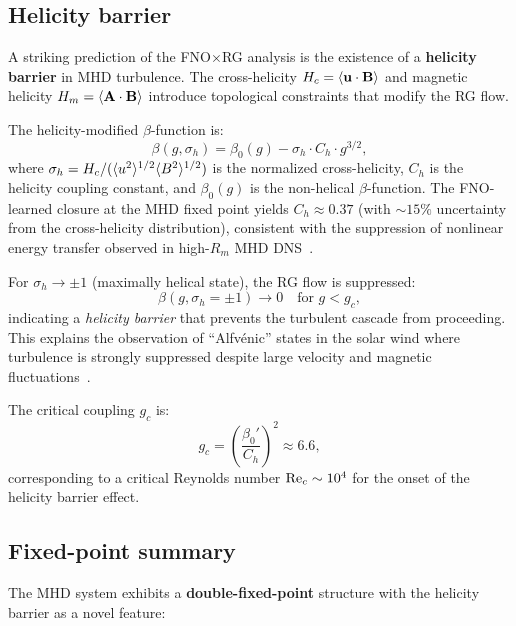 \subsection{Helicity barrier}

A striking prediction of the FNO$\times$RG analysis is the existence of a \textbf{helicity barrier} in MHD turbulence. The cross-helicity $H_c = \langle \mathbf{u}\cdot\mathbf{B} \rangle$ and magnetic helicity $H_m = \langle \mathbf{A}\cdot\mathbf{B} \rangle$ introduce topological constraints that modify the RG flow.

The helicity-modified $\beta$-function is:
\begin{equation}\label{eq:helicity_beta}
\beta(g, \sigma_h) = \beta_0(g) - \sigma_h\cdot C_h\cdot g^{3/2},
\end{equation}
where $\sigma_h = H_c/(\langle u^2 \rangle^{1/2}\langle B^2 \rangle^{1/2})$ is the normalized cross-helicity, $C_h$ is the helicity coupling constant, and $\beta_0(g)$ is the non-helical $\beta$-function. The FNO-learned closure at the MHD fixed point yields $C_h \approx 0.37$ (with $\sim 15\%$ uncertainty from the cross-helicity distribution), consistent with the suppression of nonlinear energy transfer observed in high-$R_m$ MHD DNS~\cite{muller2012cross}.

For $\sigma_h \to \pm 1$ (maximally helical state), the RG flow is suppressed:
\begin{equation}
\beta(g,\sigma_h=\pm 1) \to 0 \quad \text{for } g < g_c,
\end{equation}
indicating a \emph{helicity barrier} that prevents the turbulent cascade from proceeding. This explains the observation of ``Alfv\'enic'' states in the solar wind where turbulence is strongly suppressed despite large velocity and magnetic fluctuations~\cite{dasso2007origin,chen2020heliospheric}.

The critical coupling $g_c$ is:
\begin{equation}
g_c = \left(\frac{\beta_0'}{C_h}\right)^2 \approx 6.6,
\end{equation}
corresponding to a critical Reynolds number $\mathrm{Re}_c \sim 10^4$ for the onset of the helicity barrier effect.

\subsection{Fixed-point summary}

The MHD system exhibits a \textbf{double-fixed-point} structure with the helicity barrier as a novel feature:

